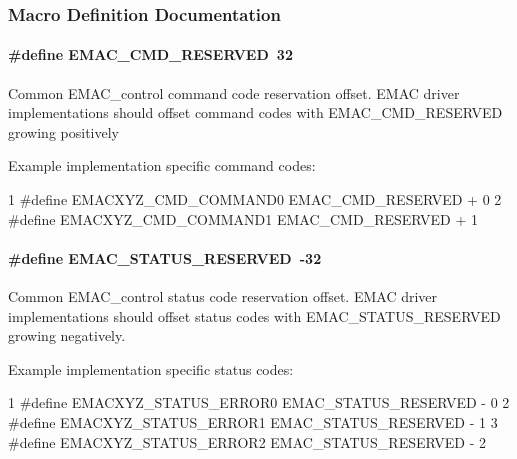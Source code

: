 \subsubsection{Macro Definition Documentation}
\paragraph[{E\+M\+A\+C\+\_\+\+C\+M\+D\+\_\+\+R\+E\+S\+E\+R\+V\+E\+D}]{\setlength{\rightskip}{0pt plus 5cm}\#define E\+M\+A\+C\+\_\+\+C\+M\+D\+\_\+\+R\+E\+S\+E\+R\+V\+E\+D~32}\label{group___e_m_a_c___c_o_n_t_r_o_l_ga56f3e93517d362f44d638f1e7ecbcfdb}
Common E\+M\+A\+C\+\_\+control command code reservation offset. E\+M\+A\+C driver implementations should offset command codes with E\+M\+A\+C\+\_\+\+C\+M\+D\+\_\+\+R\+E\+S\+E\+R\+V\+E\+D growing positively

Example implementation specific command codes\+: 
\begin{DoxyCode}
1 #define EMACXYZ\_CMD\_COMMAND0     EMAC\_CMD\_RESERVED + 0
2 #define EMACXYZ\_CMD\_COMMAND1     EMAC\_CMD\_RESERVED + 1
\end{DoxyCode}
\paragraph[{E\+M\+A\+C\+\_\+\+S\+T\+A\+T\+U\+S\+\_\+\+R\+E\+S\+E\+R\+V\+E\+D}]{\setlength{\rightskip}{0pt plus 5cm}\#define E\+M\+A\+C\+\_\+\+S\+T\+A\+T\+U\+S\+\_\+\+R\+E\+S\+E\+R\+V\+E\+D~-\/32}\label{group___e_m_a_c___c_o_n_t_r_o_l_gada65346f7e4d230ac1998870744f6161}
Common E\+M\+A\+C\+\_\+control status code reservation offset. E\+M\+A\+C driver implementations should offset status codes with E\+M\+A\+C\+\_\+\+S\+T\+A\+T\+U\+S\+\_\+\+R\+E\+S\+E\+R\+V\+E\+D growing negatively.

Example implementation specific status codes\+: 
\begin{DoxyCode}
1 #define EMACXYZ\_STATUS\_ERROR0    EMAC\_STATUS\_RESERVED - 0
2 #define EMACXYZ\_STATUS\_ERROR1    EMAC\_STATUS\_RESERVED - 1
3 #define EMACXYZ\_STATUS\_ERROR2    EMAC\_STATUS\_RESERVED - 2
\end{DoxyCode}
 